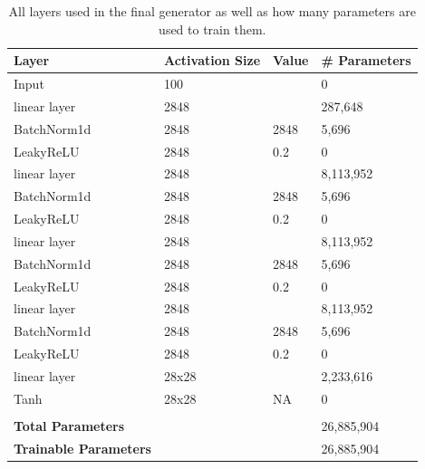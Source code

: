 \documentclass[12pt, fleqn, titlepage]{article}
\begin{document}
\begin{table}[H]
	\centering
	\begin{tabular}{llll}\toprule
		Layer                        & Activation Size & Value & \# Parameters\\ \midrule
		Input                        & 100             &       & 0            \\
		linear layer                 & 2848            &       & 287,648      \\
		BatchNorm1d                  & 2848            & 2848  & 5,696        \\
		LeakyReLU                    & 2848            & 0.2   & 0            \\
		linear layer                 & 2848            &       & 8,113,952    \\
		BatchNorm1d                  & 2848            & 2848  & 5,696        \\
		LeakyReLU                    & 2848            & 0.2   & 0            \\
		linear layer                 & 2848            &       & 8,113,952    \\
		BatchNorm1d                  & 2848            & 2848  & 5,696        \\
		LeakyReLU                    & 2848            & 0.2   & 0            \\
		linear layer                 & 2848            &       & 8,113,952    \\
		BatchNorm1d                  & 2848            & 2848  & 5,696        \\
		LeakyReLU                    & 2848            & 0.2   & 0            \\
		linear layer                 & 28x28           &       & 2,233,616    \\
		Tanh                         & 28x28           & NA    & 0            \\
		                             &                 &       &              \\
		\textbf{Total Parameters}    &                 &       & 26,885,904   \\
		\textbf{Trainable Parameters}&                 &       & 26,885,904   \\  \bottomrule
	\end{tabular}
	\caption{All layers used in the final generator as well as how many parameters are used to train them.}
	\label{tab:gan_generator}
\end{table}
\end{document}
